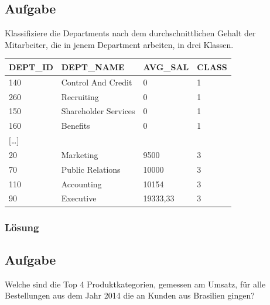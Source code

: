 \subsection{Aufgabe}
Klassifiziere die Departments nach dem durchschnittlichen Gehalt der Mitarbeiter, die in jenem Department arbeiten, in drei Klassen.

\begin{table}[H]
  \centering
  \begin{tabular}{|l|l|l|l|}
    \hline
    \textbf{DEPT\_ID} & \textbf{DEPT\_NAME}  & \textbf{AVG\_SAL} & \textbf{CLASS} \\
    \hline
    140               & Control And Credit   & 0                 & 1              \\
    260               & Recruiting           & 0                 & 1              \\
    150               & Shareholder Services & 0                 & 1              \\
    160               & Benefits             & 0                 & 1              \\
    $[$\dots$]$       &                      &                   &                \\
    20                & Marketing            & 9500              & 3              \\
    70                & Public Relations     & 10000             & 3              \\
    110               & Accounting           & 10154             & 3              \\
    90                & Executive            & 19333,33          & 3              \\
    \hline
  \end{tabular}
\end{table}

\subsubsection*{Lösung}
\label{subsubsec:uebung_07.aufgabe_02.loesung}


\label{subsec:uebung_07.aufgabe_03}
\subsection{Aufgabe}
Welche sind die Top 4 Produktkategorien, gemessen am Umsatz, für alle Bestellungen aus dem Jahr 2014 die an Kunden aus Brasilien gingen?

